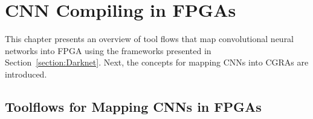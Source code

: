     \section{CNN Compiling in FPGAs}
    \label{section:CNNVersat}

    This chapter presents an overview of tool flows that map convolutional neural
    networks into FPGA using the frameworks presented in
    Section~\ref{section:Darknet}. Next, the concepts for mapping CNNs
    into CGRAs are introduced.


    \subsection{Toolflows for Mapping CNNs in FPGAs}
    \label{section:toolflow}

